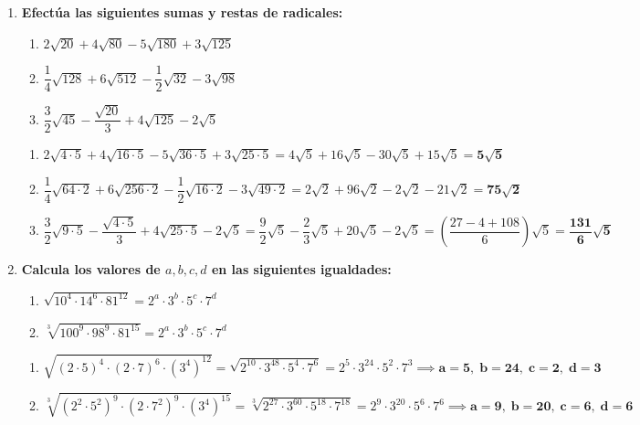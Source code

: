 \documentclass[a4paper,12pt]{article}
\begin{document}
\begin{enumerate}
    \item \textbf{Efectúa las siguientes sumas y restas de radicales:}
        \begin{enumerate}[label=\alph*)]
            \item $2\sqrt{20} + 4\sqrt{80} - 5\sqrt{180} + 3\sqrt{125}$
            \item $\dfrac{1}{4}\sqrt{128} + 6\sqrt{512} - \dfrac{1}{2}\sqrt{32} - 3\sqrt{98}$
            \item $\dfrac{3}{2}\sqrt{45} - \dfrac{\sqrt{20}}{3} + 4\sqrt{125} - 2\sqrt{5}$
        \end{enumerate}
        \begin{solucion}
            \begin{enumerate}[label=\alph*)]
                \item $2\sqrt{4\cdot 5} + 4\sqrt{16\cdot 5} - 5\sqrt{36\cdot 5} + 3\sqrt{25\cdot 5} = 4\sqrt{5} + 16\sqrt{5} - 30\sqrt{5} + 15\sqrt{5} = \mathbf{5\sqrt{5}}$
                \item $\dfrac{1}{4}\sqrt{64\cdot 2} + 6\sqrt{256\cdot 2} - \dfrac{1}{2}\sqrt{16\cdot 2} - 3\sqrt{49\cdot 2} = 2\sqrt{2} + 96\sqrt{2} - 2\sqrt{2} - 21\sqrt{2} = \mathbf{75\sqrt{2}}$
                \item $\dfrac{3}{2}\sqrt{9\cdot 5} - \dfrac{\sqrt{4\cdot 5}}{3} + 4\sqrt{25\cdot 5} - 2\sqrt{5} = \dfrac{9}{2}\sqrt{5} - \dfrac{2}{3}\sqrt{5} + 20\sqrt{5} - 2\sqrt{5} = \left(\dfrac{27 - 4 + 108}{6}\right)\sqrt{5} = \mathbf{\dfrac{131}{6}\sqrt{5}}$
            \end{enumerate}
        \end{solucion}

    \item \textbf{Calcula los valores de $a, b, c, d$ en las siguientes igualdades:}
        \begin{enumerate}[label=\alph*)]
            \item $\sqrt{10^{4} \cdot 14^{6} \cdot 81^{12}} = 2^{a} \cdot 3^{b} \cdot 5^{c} \cdot 7^{d}$
            \item $\sqrt[3]{100^{9} \cdot 98^{9} \cdot 81^{15}} = 2^{a} \cdot 3^{b} \cdot 5^{c} \cdot 7^{d}$
        \end{enumerate}
        \begin{solucion}
            \begin{enumerate}[label=\alph*)]
                \item $\sqrt{(2\cdot 5)^{4} \cdot (2\cdot 7)^{6} \cdot (3^{4})^{12}} = \sqrt{2^{10} \cdot 3^{48} \cdot 5^{4} \cdot 7^{6}} = 2^{5} \cdot 3^{24} \cdot 5^{2} \cdot 7^{3} \implies \mathbf{a=5,\; b=24,\; c=2,\; d=3}$
                \item $\sqrt[3]{(2^{2}\cdot 5^{2})^{9} \cdot (2\cdot 7^{2})^{9} \cdot (3^{4})^{15}} = \sqrt[3]{2^{27} \cdot 3^{60} \cdot 5^{18} \cdot 7^{18}} = 2^{9} \cdot 3^{20} \cdot 5^{6} \cdot 7^{6} \implies \mathbf{a=9,\; b=20,\; c=6,\; d=6}$
            \end{enumerate}
        \end{solucion}


\end{enumerate}
\end{document}
